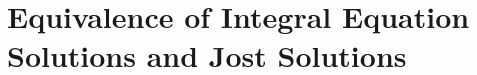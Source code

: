 \documentclass[../dissertation.tex]{subfiles}
\begin{document}
\section{Equivalence of Integral Equation Solutions and Jost Solutions}\label{sec4:equiv}







\end{document}
